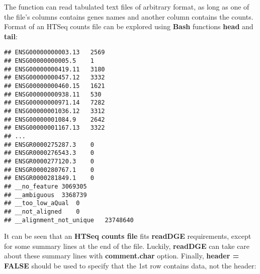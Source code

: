 \documentclass[]{book}
\newenvironment{Shaded}{\begin{snugshade}}{\end{snugshade}}
\newcommand{\KeywordTok}[1]{\textcolor[rgb]{0.13,0.29,0.53}{\textbf{#1}}}
\newcommand{\DataTypeTok}[1]{\textcolor[rgb]{0.13,0.29,0.53}{#1}}
\newcommand{\DecValTok}[1]{\textcolor[rgb]{0.00,0.00,0.81}{#1}}
\newcommand{\StringTok}[1]{\textcolor[rgb]{0.31,0.60,0.02}{#1}}
\newcommand{\CommentTok}[1]{\textcolor[rgb]{0.56,0.35,0.01}{\textit{#1}}}
\newcommand{\OtherTok}[1]{\textcolor[rgb]{0.56,0.35,0.01}{#1}}
\newcommand{\OperatorTok}[1]{\textcolor[rgb]{0.81,0.36,0.00}{\textbf{#1}}}
\newcommand{\NormalTok}[1]{#1}
\begin{document}
The function can read tabulated text files of arbitrary format, as long
as one of the file's columns contains genes names and another column
contains the counts. Format of an HTSeq counts file can be explored
using \textbf{Bash} functions \textbf{head} and \textbf{tail}:

\begin{verbatim}
## ENSG00000000003.13   2569
## ENSG00000000005.5    1
## ENSG00000000419.11   3180
## ENSG00000000457.12   3332
## ENSG00000000460.15   1621
## ENSG00000000938.11   530
## ENSG00000000971.14   7282
## ENSG00000001036.12   3312
## ENSG00000001084.9    2642
## ENSG00000001167.13   3322
## ...
## ENSGR0000275287.3    0
## ENSGR0000276543.3    0
## ENSGR0000277120.3    0
## ENSGR0000280767.1    0
## ENSGR0000281849.1    0
## __no_feature 3069305
## __ambiguous  3368739
## __too_low_aQual  0
## __not_aligned    0
## __alignment_not_unique   23748640
\end{verbatim}

It can be seen that an \textbf{HTSeq counts file} fits \textbf{readDGE}
requirements, except for some summary lines at the end of the file.
Luckily, \textbf{readDGE} can take care about these summary lines with
\textbf{comment.char} option. Finally, \textbf{header = FALSE} should be
used to specify that the 1st row contains data, not the header:

\begin{Shaded}
\end{Shaded}
\end{document}
